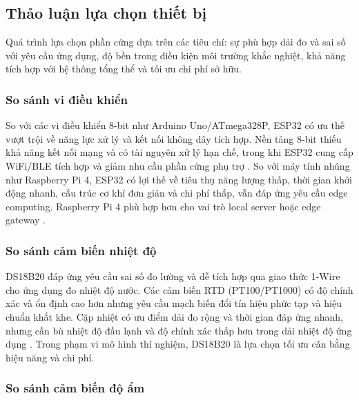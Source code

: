 \documentclass[../main.tex]{subfiles}
\begin{document}
\subsection{Thảo luận lựa chọn thiết bị}
\label{sec:device_selection_discussion}

Quá trình lựa chọn phần cứng dựa trên các tiêu chí: sự phù hợp dải đo và sai số với yêu cầu ứng dụng, độ bền trong điều kiện môi trường khắc nghiệt, khả năng tích hợp với hệ thống tổng thể và tối ưu chi phí sở hữu.

\subsubsection{So sánh vi điều khiển}
\label{sec:microcontroller_comparison}

So với các vi điều khiển 8-bit như Arduino Uno/ATmega328P, ESP32 có ưu thế vượt trội về năng lực xử lý và kết nối không dây tích hợp. Nền tảng 8-bit thiếu khả năng kết nối mạng và có tài nguyên xử lý hạn chế, trong khi ESP32 cung cấp WiFi/BLE tích hợp và giảm nhu cầu phần cứng phụ trợ \cite{Espressif_ESP32_technical_reference,microchip_atmega328p}. So với máy tính nhúng như Raspberry Pi 4, ESP32 có lợi thế về tiêu thụ năng lượng thấp, thời gian khởi động nhanh, cấu trúc cơ khí đơn giản và chi phí thấp, vẫn đáp ứng yêu cầu edge computing. Raspberry Pi 4 phù hợp hơn cho vai trò local server hoặc edge gateway \cite{raspberrypi4_specs}.

\subsubsection{So sánh cảm biến nhiệt độ}
\label{sec:temperature_sensor_comparison}

DS18B20 đáp ứng yêu cầu sai số đo lường và dễ tích hợp qua giao thức 1-Wire cho ứng dụng đo nhiệt độ nước. Các cảm biến RTD (PT100/PT1000) có độ chính xác và ổn định cao hơn nhưng yêu cầu mạch biến đổi tín hiệu phức tạp và hiệu chuẩn khắt khe. Cặp nhiệt có ưu điểm dải đo rộng và thời gian đáp ứng nhanh, nhưng cần bù nhiệt độ đầu lạnh và độ chính xác thấp hơn trong dải nhiệt độ ứng dụng \cite{datasheet_DS18B20,ashrae2020cooling}. Trong phạm vi mô hình thí nghiệm, DS18B20 là lựa chọn tối ưu cân bằng hiệu năng và chi phí.

\subsubsection{So sánh cảm biến độ ẩm}
\label{sec:humidity_sensor_comparison}
\end{document}
